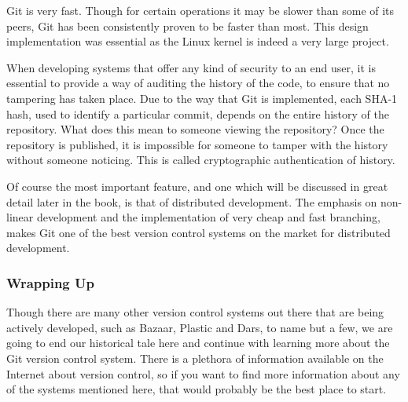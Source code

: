 Git is very fast.  Though for certain operations it may be slower than some of its peers, Git has been consistently proven to be faster than most.  This design implementation was essential as the Linux kernel is indeed a very large project.  

When developing systems that offer any kind of security to an end user, it is essential to provide a way of auditing the history of the code, to ensure that no tampering has taken place.  Due to the way that Git is implemented, each SHA-1 hash, used to identify a particular commit, depends on the entire history of the repository.  What does this mean to someone viewing the repository?  Once the repository is published, it is impossible for someone to tamper with the history without someone noticing.  This is called cryptographic authentication of history.

Of course the most important feature, and one which will be discussed in great detail later in the book, is that of distributed development.  The emphasis on non-linear development and the implementation of very cheap and fast branching, makes Git one of the best version control systems on the market for distributed development.

\subsubsection{Wrapping Up}
Though there are many other version control systems out there that are being actively developed, such as Bazaar, Plastic and Dars, to name but a few, we are going to end our historical tale here and continue with learning more about the Git version control system.  There is a plethora of information available on the Internet about version control, so if you want to find more information about any of the systems mentioned here, that would probably be the best place to start.

